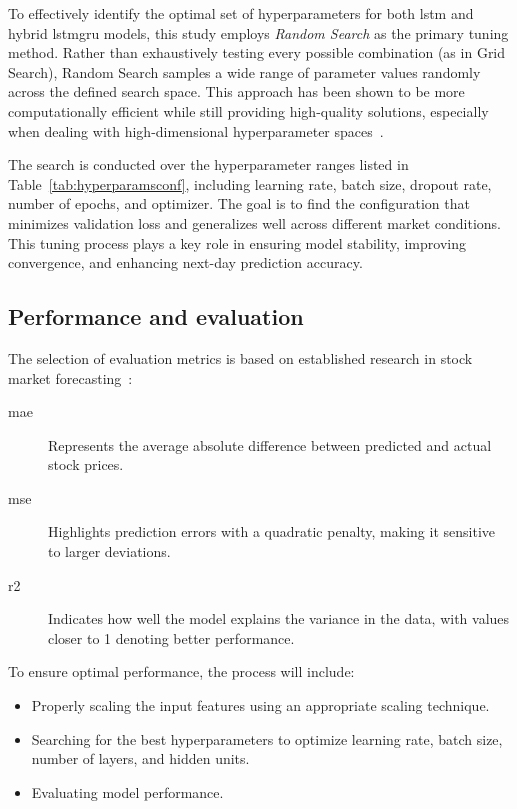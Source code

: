 To effectively identify the optimal set of hyperparameters for both \acrshort{lstm} and hybrid \acrshort{lstmgru} models, 
this study employs \emph{Random Search} as the primary tuning method. Rather than exhaustively testing every possible 
combination (as in Grid Search), Random Search samples a wide range of parameter values randomly across the defined search 
space. This approach has been shown to be more computationally efficient while still providing high-quality solutions,
especially when dealing with high-dimensional hyperparameter spaces~\parencite{bergstra2012random}.

The search is conducted over the hyperparameter ranges listed in Table~\ref{tab:hyperparamsconf}, including learning rate, 
batch size, dropout rate, number of epochs, and optimizer. The goal is to find the configuration that minimizes 
validation loss and generalizes well across different market conditions. This tuning process plays a key role in 
ensuring model stability, improving convergence, and enhancing next-day prediction accuracy.

\subsection{Performance and evaluation}

The selection of evaluation metrics is based on established research in stock market 
forecasting~\parencite{agrawal2022StockPrediction, nabipour2020DeepLearning, guo2024LSTMStock}:

\begin{description}
\item[\acrfull{mae}] Represents the average absolute difference between predicted and 
                     actual stock prices.
\item[\acrfull{mse}] Highlights prediction errors with a quadratic penalty, making it 
                     sensitive to larger deviations.
\item[\acrfull{r2}] Indicates how well the model explains the variance in the data, with values 
                    closer to 1 denoting better performance.
\end{description}

To ensure optimal performance, the process will include:
\begin{itemize}
    \item Properly scaling the input features using an appropriate scaling technique.
    \item Searching for the best hyperparameters to optimize learning rate, batch size, number of layers, and hidden units.
    \item Evaluating model performance.
\end{itemize}
